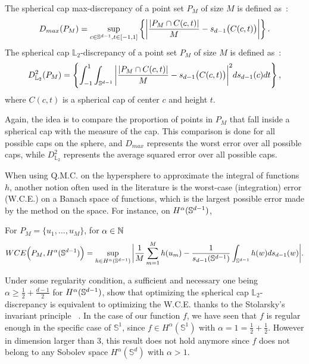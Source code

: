 \begin{D}
The spherical cap max-discrepancy of a point set $P_M$ of size $M$ is defined as~\citep{marzo2021discrepancy}:
\begin{equation*}
    D_{max}(P_M) = \sup_{c\in \mathbb{S}^{d-1} ,t \in [-1,1]}\left\lbrace  \bigg | \frac{|P_M \cap C(c,t)|}{M} - s_{d-1}\big(C(c,t)\big)\bigg| \right\rbrace.
\end{equation*}\label{eq:Spheremax}
The spherical cap $\mathbb{L}_2$-discrepancy of a point set $P_M$ of size $M$ is defined as~\citep{brauchart2011optimal}:
\begin{equation*}
D_{\mathbb{L}_2}^2(P_M) = \left\lbrace \int_{-1}^1 \int_{\mathbb{S}^{d-1}} \bigg | \frac{|P_M \cap C(c,t)|}{M} - s_{d-1}\big(C(c,t)\big)\bigg|^2 ds_{d-1}(c) dt\right\rbrace ,
\end{equation*}\label{eq:SphereCal}
where $C(c,t)$ is  a spherical cap of center $c$ and height $t$.
\end{D}
Again, the idea is to compare the proportion of points in $P_M$ that fall inside a spherical cap with the measure of the cap. This comparison is done for all possible caps on the sphere, and $D_{max}$ represents the worst error over all possible caps, while $D_{\mathbb{L}_2}^2$ represents the average squared error over all possible caps.


When using 
{Q.M.C.}
on the hypersphere to approximate the integral of functions $h$, 
another notion often used in the literature is the worst-case (integration) error (W.C.E.) on a Banach space of functions, which is the largest possible error made by the method on the space. 
For instance, on $H^{\alpha}(\mathbb{S}^{d-1})$,
\begin{D}
For $P_M = \{ u_1,\hdots, u_M\}$, for $\alpha \in \mathbb{N}$
\begin{equation*}
WCE\Big(P_M,H^{\alpha}(\mathbb{S}^{d-1})\Big)= \sup_{h\in H^{\alpha}(\mathbb{S}^{d-1})} \bigg |\displaystyle \frac{1}{M} \sum\limits_{m=1}^M h(u_m) - \frac{1}{s_{d-1}(\mathbb{S}^{d-1})}\int_{\mathbb{S}^{d-1}} h(w) ds_{d-1}(w) \bigg |.
\end{equation*}
\end{D}
\noindent Under some regularity condition, a sufficient and necessary one being $\alpha \geq \frac{1}{2} + \frac{d - 1}{2}$ for $H^{\alpha}(\mathbb{S}^{d-1})$, \citet{Brauchart_2013} show that optimizing the spherical cap $\mathbb{L}_2$-discrepancy is equivalent to optimizing the W.C.E. thanks to the Stolarsky's invariant principle ~\citep{stolarsky1973}.
In the case of our function $f$, we have seen that $f$ is regular enough in the specific case of $\mathbb{S}^1$, since $f\in H^{\alpha} (\mathbb{S}^1)$ with $\alpha = 1 = \frac{1}{2} + \frac{1}{2}$. However in dimension larger than $3$, this result does not hold anymore since $f$ does not belong to any Sobolev space $H^{\alpha} (\mathbb{S}^d)$ with $\alpha > 1$.

